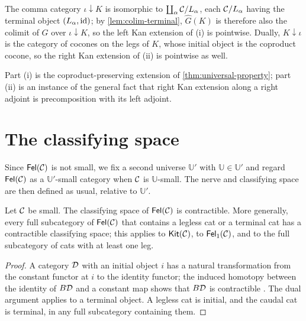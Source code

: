 \begin{remark}\label{rem:kan-pointwise}
The comma category $\iota\downarrow K$ is isomorphic to $\coprod_\alpha\mathcal{C}/L_\alpha$,
each $\mathcal{C}/L_\alpha$ having the terminal object $(L_\alpha,\mathrm{id})$; by
\cref{lem:colim-terminal}, $\widehat G(K)$ is therefore also the colimit of $G$
over $\iota\downarrow K$, so the left Kan extension of (i) is pointwise. Dually,
$K\downarrow\iota$ is the category of cocones on the legs of $K$, whose initial
object is the coproduct cocone, so the right Kan extension of (ii) is pointwise
as well.
\end{remark}

\begin{remark}\label{rem:kan-honest}
Part (i) is the coproduct-preserving extension of \cref{thm:universal-property};
part (ii) is an instance of the general fact that right Kan extension along a
right adjoint is precomposition with its left adjoint.
\end{remark}

\section{The classifying space}\label{sec:nerve}

Since $\mathsf{Fel}(\mathcal{C})$ is not small, we fix a second universe $\mathbb U'$ with
$\mathbb U\in\mathbb U'$ and regard $\mathsf{Fel}(\mathcal{C})$ as a $\mathbb U'$-small category
when $\mathcal{C}$ is $\mathbb U$-small. The nerve and classifying space are then
defined as usual, relative to $\mathbb U'$.

\begin{theorem}\label{thm:contractible}
Let $\mathcal{C}$ be small. The classifying space of $\mathsf{Fel}(\mathcal{C})$ is contractible.
More generally, every full subcategory of $\mathsf{Fel}(\mathcal{C})$ that contains a legless cat
or a terminal cat has a contractible classifying space; this applies to
$\mathsf{Kit}(\mathcal{C})$, to $\mathsf{Fel}_1(\mathcal{C})$, and to the full subcategory of cats with at least
one leg.
\end{theorem}

\begin{proof}
A category $\mathcal{D}$ with an initial object $i$ has a natural transformation from
the constant functor at $i$ to the identity functor; the induced homotopy
between the identity of $B\mathcal{D}$ and a constant map shows that $B\mathcal{D}$ is
contractible \cite{Segal1968,Quillen1973}. The dual argument applies to a
terminal object. A legless cat is initial, and the caudal cat is terminal, in
any full subcategory containing them.
\end{proof}

